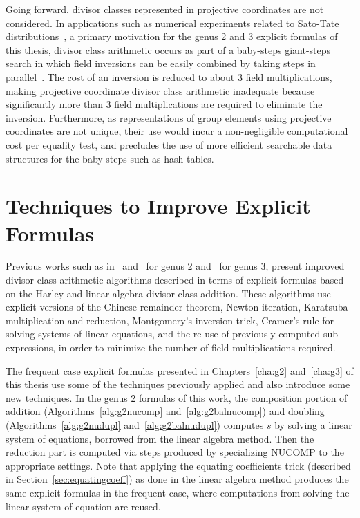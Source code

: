 Going forward, divisor classes represented in projective coordinates are not
considered. In applications such as numerical experiments related to Sato-Tate
distributions~\cite{Sutherland_sato_2016}, a primary motivation for the genus 2
and 3 explicit formulas of this thesis, divisor class arithmetic occurs as part
of a baby-steps giant-steps search in which field inversions can be easily
combined by taking steps in parallel~\cite[\S~4.1]{Kedlaya_lseries_2008}. The
cost of an inversion is reduced to about $3$ field multiplications, making
projective coordinate divisor class arithmetic inadequate because significantly
more than 3 field multiplications are required to eliminate the inversion.
Furthermore,  as representations of group elements using projective coordinates
are not unique, their use would incur a non-negligible computational cost per
equality test, and precludes the use of more efficient searchable data
structures for the baby steps such as hash tables.



\section{Techniques to Improve Explicit Formulas} 
\label{sec:explTechniques}
Previous works such as in~\cite{Lange_explicit_2005}
and~\cite{CostelloLauter_geo_2011} for genus 2 and~\cite{fan_g3_2006} for genus
3, present improved divisor class arithmetic algorithms described in terms of
explicit formulas based on the Harley and linear algebra divisor class addition.
These algorithms use explicit versions of the Chinese remainder theorem, Newton
iteration, Karatsuba multiplication and reduction, Montgomery's inversion trick,
Cramer's rule for solving systems of linear equations, and the re-use of
previously-computed sub-expressions, in order to minimize the number of field
multiplications required. 

The frequent case explicit formulas presented in Chapters~\ref{cha:g2}
and~\ref{cha:g3} of this thesis use some of the techniques previously applied
and also introduce some new techniques. In the genus 2 formulas of this work,
the composition portion of addition (Algorithms~\ref{alg:g2nucomp}
and~\ref{alg:g2balnucomp}) and doubling (Algorithms~\ref{alg:g2nudupl}
and~\ref{alg:g2balnudupl}) computes $s$ by solving a linear system of equations,
borrowed from the linear algebra method. Then the reduction part is computed via
steps produced by specializing NUCOMP to the appropriate settings. Note that
applying the equating coefficients trick (described in
Section~\ref{sec:equatingcoeff}) as done in the linear algebra method
\cite{CostelloLauter_geo_2011} produces the same explicit formulas in the
frequent case, where computations from solving the linear system of equation are
reused. 

